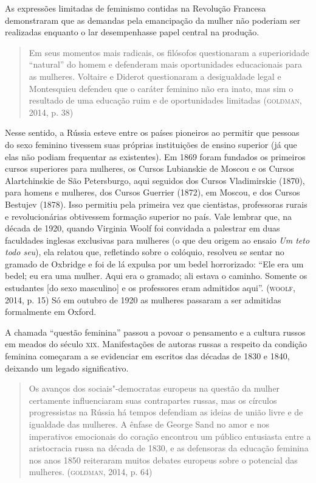 \documentclass{article}
\begin{document}
As expressões limitadas de feminismo contidas na Revolução Francesa
demonstraram que as demandas pela emancipação da mulher não poderiam ser
realizadas enquanto o lar desempenhasse papel central na produção.

\begin{quote}
Em seus momentos mais radicais, os filósofos questionaram a
superioridade ``natural'' do homem e defenderam mais oportunidades
educacionais para as mulheres. Voltaire e Diderot questionaram a
desigualdade legal e Montesquieu defendeu que o caráter feminino não era
inato, mas sim o resultado de uma educação ruim e de oportunidades
limitadas (\textsc{goldman}, 2014, p. 38)
\end{quote}

Nesse sentido, a Rússia esteve
entre os países pioneiros ao permitir que pessoas do sexo feminino
tivessem suas próprias instituições de ensino superior (já que elas não
podiam frequentar as existentes). Em 1869 foram fundados os primeiros
cursos superiores para mulheres, os Cursos Lubianskie de Moscou e os
Cursos Alartchinskie de São Petersburgo, aqui seguidos dos Cursos
Vladimirskie (1870), para homens e mulheres, dos Cursos Guerrier (1872),
em Moscou, e dos Cursos Bestujev (1878). Isso permitiu pela primeira vez
que cientistas, professoras rurais e revolucionárias obtivessem formação
superior no país. Vale lembrar que, na década de 1920, quando Virginia
Woolf foi convidada a palestrar em duas faculdades inglesas exclusivas
para mulheres (o que deu origem ao ensaio \emph{Um teto todo seu}), ela
relatou que, refletindo sobre o colóquio, resolveu se sentar no gramado
de Oxbridge e foi de lá expulsa por um bedel horrorizado: ``Ele era um
bedel; eu era uma mulher. Aqui era o gramado; ali estava o caminho.
Somente os estudantes {[}do sexo masculino{]} e os professores eram
admitidos aqui''. (\textsc{woolf}, 2014, p. 15) Só em outubro de 1920 as mulheres
passaram a ser admitidas formalmente em Oxford.

A chamada ``questão feminina'' passou a povoar o pensamento e a cultura
russos em meados do século \textsc{xix}. Manifestações de autoras russas a
respeito da condição feminina começaram a se evidenciar em escritos das
décadas de 1830 e 1840, deixando um legado significativo.

\begin{quote}
Os avanços dos sociais"-democratas europeus na questão da mulher
certamente influenciaram suas contrapartes russas, mas os círculos
progressistas na Rússia há tempos defendiam as ideias de união livre e
de igualdade das mulheres. A ênfase de George Sand no amor e nos
imperativos emocionais do coração encontrou um público entusiasta entre
a aristocracia russa na década de 1830, e as defensoras da educação
feminina nos anos 1850 reiteraram muitos debates europeus sobre o
potencial das mulheres. (\textsc{goldman}, 2014, p. 64)
\end{quote}
\end{document}
